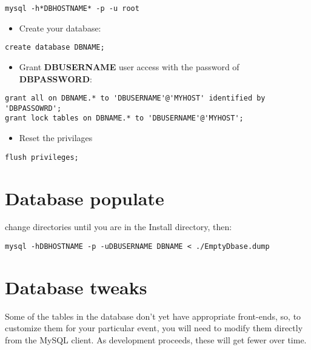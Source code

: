 \documentclass[tablesignature]{scrartcl}
\begin{document}
\begin{verbatim}
mysql -h*DBHOSTNAME* -p -u root
\end{verbatim}


\begin{itemize}
\item Create your database:
\end{itemize}

\begin{verbatim}
create database DBNAME;
\end{verbatim}


\begin{itemize}
\item Grant \textbf{DBUSERNAME} user access with the password of \textbf{DBPASSWORD}:
\end{itemize}

\begin{verbatim}
grant all on DBNAME.* to 'DBUSERNAME'@'MYHOST' identified by 'DBPASSOWRD';
grant lock tables on DBNAME.* to 'DBUSERNAME'@'MYHOST';
\end{verbatim}


\begin{itemize}
\item Reset the privilages
\end{itemize}

\begin{verbatim}
flush privileges;
\end{verbatim}
\section{Database populate}
\label{sec-5}

  change directories until you are in the Install directory, then:
\begin{verbatim}
mysql -hDBHOSTNAME -p -uDBUSERNAME DBNAME < ./EmptyDbase.dump
\end{verbatim}
\section{Database tweaks}
\label{sec-6}

  Some of the tables in the database don't yet have appropriate
  front-ends, so, to customize them for your particular event, you
  will need to modify them directly from the MySQL client.  As
  development proceeds, these will get fewer over time.
\end{document}
